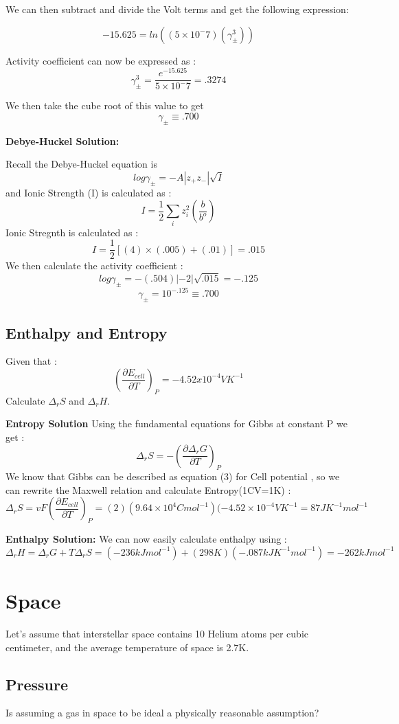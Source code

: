 \documentclass{article}
\newcommand{\be}{\begin{equation}}
\newcommand{\ee}{\end{equation}}
\newcommand{\pd}{\partial}
\begin{document}
We can then subtract and divide the Volt terms and get the following expression: 


\be
-15.625 = ln((5\times 10^-7) (\gamma^3_{\pm}))
\ee

Activity coefficient can now be expressed as : 
\be
\gamma^3_{\pm} = \frac{e^{-15.625}}{5\times 10^-7} = .3274
\ee

We then take the cube root of this value to get 
\be
\gamma_{\pm} \equiv .700
\ee

\textbf{Debye-Huckel Solution:}

Recall the Debye-Huckel equation is 
\be
log\gamma_{\pm} = - A|z_+z_-|\sqrt{I}
\ee
and Ionic Strength (I) is calculated as : 
\be
I = \frac{1}{2}\sum_i z^2_i\left(\frac{b}{b^o}\right)
\ee
Ionic Stregnth is calculated as : 
\be
I= \frac{1}{2} [(4)\times (.005)+(.01)]= .015
\ee
We then calculate the activity coefficient : 
\be
log\gamma_{\pm} = - (.504)|-2|\sqrt{.015} = -.125
\ee
\be
\gamma_{\pm} = 10^{-.125} \equiv .700
\ee


\subsection{Enthalpy and Entropy}

Given that :
\be
\left(\frac{\pd E_{cell}}{\pd T}\right)_P = -4.52 x 10^{-4} V K^{-1} 
\ee
Calculate $\Delta_r S$ and $\Delta_r H$. 

\textbf{Entropy Solution}
Using the fundamental equations for Gibbs at constant P we get : 
\be
\Delta_rS=-\left(\frac{\pd \Delta_rG}{\pd T}\right)_P
\ee
We know that Gibbs can be described as equation (3) for Cell potential , so we can rewrite the Maxwell relation and calculate Entropy(1CV=1K) : 
\be
\Delta_rS = vF\left(\frac{\pd E_{cell}}{\pd T}\right)_P= (2)(9.64 \times 10^4 Cmol^{-1})(-4.52 \times 10^{-4}VK^{-1} = 87JK^{-1}mol^{-1}
\ee

\textbf{Enthalpy Solution:}
We can now easily calculate enthalpy using : 
\be
\Delta_rH=\Delta_rG+T\Delta_rS= (-236kJmol^{-1}) + (298K)(-.087kJK^{-1}mol^{-1}) = -262kJmol^{-1}
\ee

\section{Space}
Let's assume that interstellar space contains 10 Helium atoms per cubic centimeter, and the average temperature of space is 2.7K. 

\subsection{Pressure}
Is assuming a gas in space to be ideal a physically reasonable assumption?
\end{document}
